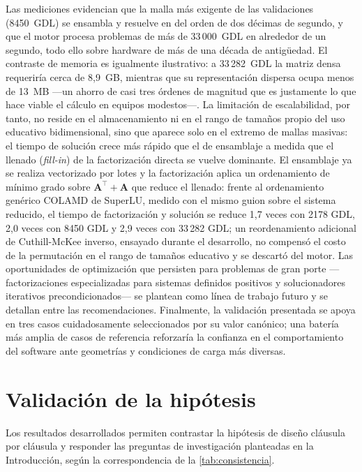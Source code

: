 Las mediciones evidencian que la malla más exigente de las validaciones (8450~GDL) se ensambla y resuelve en del orden de dos décimas de segundo, y que el motor procesa problemas de más de 33\,000~GDL en alrededor de un segundo, todo ello sobre hardware de más de una década de antigüedad. El contraste de memoria es igualmente ilustrativo: a 33\,282~GDL la matriz densa requeriría cerca de 8{,}9~GB, mientras que su representación dispersa ocupa menos de 13~MB ---un ahorro de casi tres órdenes de magnitud que es justamente lo que hace viable el cálculo en equipos modestos---. La limitación de escalabilidad, por tanto, no reside en el almacenamiento ni en el rango de tamaños propio del uso educativo bidimensional, sino que aparece solo en el extremo de mallas masivas: el tiempo de solución crece más rápido que el de ensamblaje a medida que el llenado (\emph{fill-in}) de la factorización directa se vuelve dominante. El ensamblaje ya se realiza vectorizado por lotes y la factorización aplica un ordenamiento de mínimo grado sobre $\bm{A}^{\top}+\bm{A}$ que reduce el llenado: frente al ordenamiento genérico COLAMD de SuperLU, medido con el mismo guion sobre el sistema reducido, el tiempo de factorización y solución se reduce 1,7 veces con 2178 GDL, 2,0 veces con 8450 GDL y 2,9 veces con 33\,282 GDL; un reordenamiento adicional de Cuthill-McKee inverso, ensayado durante el desarrollo, no compensó el costo de la permutación en el rango de tamaños educativo y se descartó del motor. Las oportunidades de optimización que persisten para problemas de gran porte —factorizaciones especializadas para sistemas definidos positivos y solucionadores iterativos precondicionados— se plantean como línea de trabajo futuro y se detallan entre las recomendaciones. Finalmente, la validación presentada se apoya en tres casos cuidadosamente seleccionados por su valor canónico; una batería más amplia de casos de referencia reforzaría la confianza en el comportamiento del software ante geometrías y condiciones de carga más diversas.

\section{Validación de la hipótesis}
\label{sec:validacion-hipotesis}

Los resultados desarrollados permiten contrastar la hipótesis de diseño cláusula por cláusula y responder las preguntas de investigación planteadas en la Introducción, según la correspondencia de la \autoref{tab:consistencia}.

